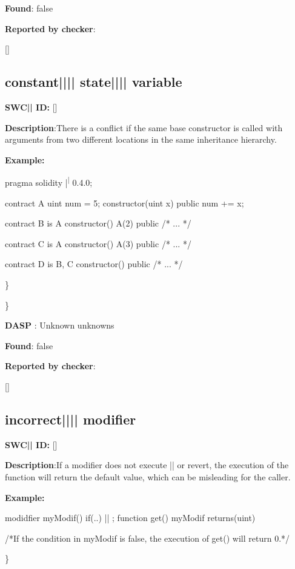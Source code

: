 \documentclass{article}
\begin{document}
\textbf{Found}: false

\textbf{Reported by checker}: 
\begin{ffcode} 

[]
\end{ffcode} 
\subsection{constant{||\textunderscore|| }state{||\textunderscore|| }variable} 
\textbf{SWC{|\textunderscore| }ID:} []

\textbf{Description}:There is a conflict if the same base constructor is called with arguments from two different locations in the same inheritance hierarchy.


\textbf{Example:} 
\begin{ffcode} 

pragma solidity |\textsuperscript| 0.4.0;

contract A{
    uint num = 5;
    constructor(uint x) public{
        num += x;
    }
}

contract B is A{
    constructor() A(2) public { /* ... */ }
}

contract C is A {
    constructor() A(3) public { /* ... */ }
}

contract D is B, C {
    constructor() public { /* ... */ }
}

\end{ffcode} 
\} 

\} 

\textbf{DASP} : Unknown unknowns

\textbf{Found}: false

\textbf{Reported by checker}: 
\begin{ffcode} 

[]
\end{ffcode} 
\subsection{incorrect{||\textunderscore|| }modifier} 
\textbf{SWC{|\textunderscore| }ID:} []

\textbf{Description}:If a modifier does not execute |\textunderscore|  or revert, the execution of the function will return the default value, which can be misleading for the caller.


\textbf{Example:} 
\begin{ffcode} 

modidfier myModif(){
    if(..){
      |\textunderscore| ;
    }
}
function get() myModif returns(uint){}

 /*If the condition in myModif is false, the execution of get() will return 0.*/ 

\end{ffcode} 
\} 
\end{document}
